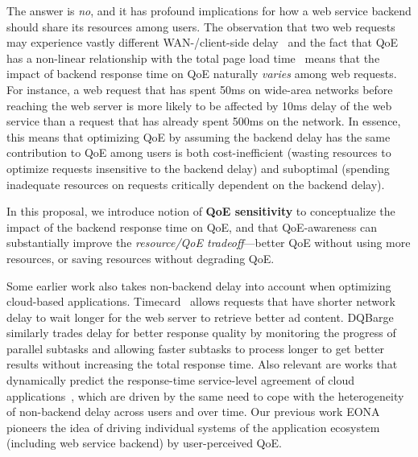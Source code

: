 The answer is {\em no}, and it has profound implications for how a web service backend should share its resources among users. 
The observation that two web requests may experience vastly different WAN-/client-side delay~\cite{timecard,dqbarge} and the fact that QoE has a non-linear relationship with the total page load time~\cite{??} means that the impact of backend response time on QoE naturally {\em varies} among web requests. 
For instance, a web request that has spent 50ms on wide-area networks before reaching the web server is more likely to be affected by 10ms delay of the web service than a request that has already spent 500ms on the network. 
In essence, this means that optimizing QoE by assuming the backend delay has the same contribution to QoE among users is both cost-inefficient (\ie wasting resources to optimize requests insensitive to the backend delay) and suboptimal (\ie spending inadequate resources on requests critically dependent on the backend delay). 


In this proposal, we introduce notion of {\bf QoE sensitivity} to conceptualize the impact of the backend response time on QoE, and 
that QoE-awareness can substantially improve the {\em resource/QoE tradeoff}---\ie better QoE without using more resources, or saving resources without degrading QoE.

Some earlier work also takes non-backend delay into account when optimizing cloud-based applications. 
Timecard~\cite{timecard} allows requests that have shorter network delay to wait longer for the web server to retrieve better ad content. 
DQBarge~\cite{dqbarge} similarly trades delay for better response quality by monitoring the progress of parallel subtasks and allowing faster subtasks to process longer to get better results without increasing the total response time.
Also relevant are works that dynamically predict the response-time service-level agreement of cloud applications~\cite{Rich Wolski}, which are driven by the same need to cope with the heterogeneity of non-backend delay across users and over time.
Our previous work EONA~\cite{eona} pioneers the idea of driving individual systems of the application ecosystem (including web service backend) by user-perceived QoE. 

